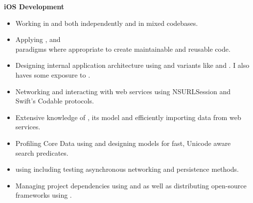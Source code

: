 \textbf{iOS Development}
\begin{itemize}[leftmargin=0mm]
\item Working in  and  both independently and in
  mixed codebases.
\item Applying ,  and
  \\paradigms where appropriate to create
  maintainable and reusable code.
\item Designing internal application architecture using  and variants
  like  and . I also haves some exposure to .
\item Networking and interacting with  web services using
  NSURLSession and Swift's Codable protocols.
\item Extensive knowledge of , its  model
  and efficiently importing data from web services.
\item Profiling Core Data using  and designing models for
  fast, Unicode aware search predicates.
\item {} using  including testing asynchronous
  networking and persistence methods.
\item Managing project dependencies using  and 
  as well as distributing open-source frameworks using .
\end{itemize}

